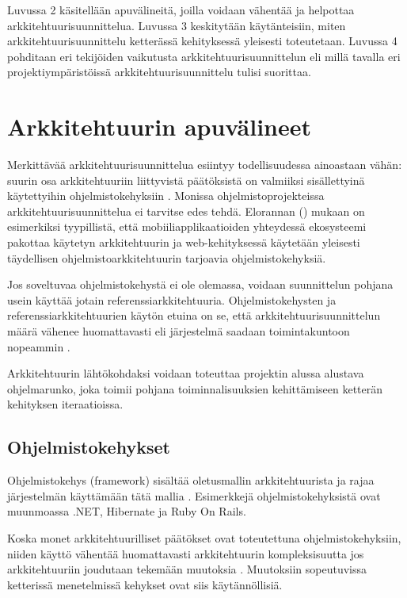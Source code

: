 Luvussa 2 käsitellään apuvälineitä, joilla voidaan vähentää ja helpottaa arkkitehtuurisuunnittelua. Luvussa 3 keskitytään käytänteisiin, miten arkkitehtuurisuunnittelu ketterässä kehityksessä yleisesti toteutetaan. Luvussa 4 pohditaan eri tekijöiden vaikutusta arkkitehtuurisuunnittelun eli millä tavalla eri projektiympäristöissä arkkitehtuurisuunnittelu tulisi suorittaa.

\chapter{Arkkitehtuurin apuvälineet}
Merkittävää arkkitehtuurisuunnittelua esiintyy todellisuudessa ainoastaan vähän: suurin osa arkkitehtuuriin liittyvistä päätöksistä on valmiiksi sisällettyinä käytettyihin ohjelmistokehyksiin \citep{bellomo2014agilely}. Monissa ohjelmistoprojekteissa arkkitehtuurisuunnittelua ei tarvitse edes  tehdä. Elorannan (\citeyear{eloranta2015techniques}) mukaan on esimerkiksi tyypillistä, että mobiiliapplikaatioiden yhteydessä ekosysteemi pakottaa käytetyn arkkitehtuurin ja web-kehityksessä käytetään yleisesti täydellisen ohjelmistoarkkitehtuurin tarjoavia ohjelmistokehyksiä.

Jos soveltuvaa ohjelmistokehystä ei ole olemassa, voidaan suunnittelun pohjana usein käyttää jotain referenssiarkkitehtuuria. Ohjelmistokehysten ja referenssiarkkitehtuurien käytön etuina on se, että arkkitehtuurisuunnittelun määrä vähenee huomattavasti eli järjestelmä saadaan toimintakuntoon nopeammin \citep{waterman_how_2015}.

Arkkitehtuurin lähtökohdaksi voidaan toteuttaa projektin alussa alustava ohjelmarunko, joka toimii pohjana toiminnalisuuksien kehittämiseen ketterän kehityksen iteraatioissa.

\section{Ohjelmistokehykset}
Ohjelmistokehys (framework) sisältää oletusmallin arkkitehtuurista ja rajaa järjestelmän käyttämään tätä mallia \citep{waterman_how_2015}. Esimerkkejä ohjelmistokehyksistä ovat muunmoassa .NET, Hibernate ja Ruby On Rails.

Koska monet arkkitehtuurilliset päätökset ovat toteutettuna ohjelmistokehyksiin, niiden käyttö vähentää huomattavasti arkkitehtuurin kompleksisuutta jos arkkitehtuuriin joudutaan tekemään muutoksia \citep{waterman_how_2015}. Muutoksiin sopeutuvissa ketterissä menetelmissä kehykset ovat siis käytännöllisiä.

